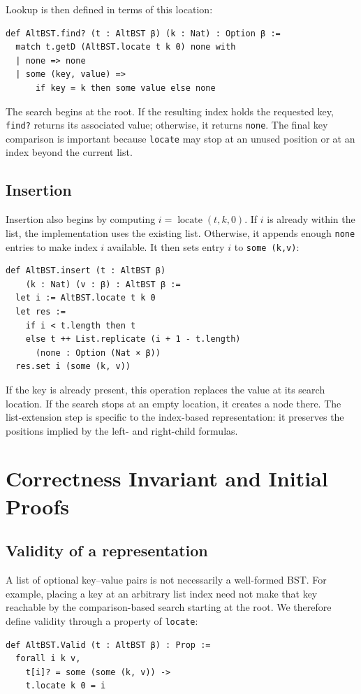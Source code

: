 \documentclass[10pt]{article}
\begin{document}
Lookup is then defined in terms of this location:
\begin{lstlisting}
def AltBST.find? (t : AltBST β) (k : Nat) : Option β :=
  match t.getD (AltBST.locate t k 0) none with
  | none => none
  | some (key, value) =>
      if key = k then some value else none
\end{lstlisting}
The search begins at the root. If the resulting index holds the requested key, \texttt{find?} returns its associated value; otherwise, it returns \texttt{none}. The final key comparison is important because \texttt{locate} may stop at an unused position or at an index beyond the current list.

\subsection{Insertion}

Insertion also begins by computing $i=\operatorname{locate}(t,k,0)$. If $i$ is already within the list, the implementation uses the existing list. Otherwise, it appends enough \texttt{none} entries to make index $i$ available. It then sets entry $i$ to \texttt{some (k,v)}:

\begin{lstlisting}
def AltBST.insert (t : AltBST β)
    (k : Nat) (v : β) : AltBST β :=
  let i := AltBST.locate t k 0
  let res :=
    if i < t.length then t
    else t ++ List.replicate (i + 1 - t.length)
      (none : Option (Nat × β))
  res.set i (some (k, v))
\end{lstlisting}

If the key is already present, this operation replaces the value at its search location. If the search stops at an empty location, it creates a node there. The list-extension step is specific to the index-based representation: it preserves the positions implied by the left- and right-child formulas.

\section{Correctness Invariant and Initial Proofs}

\subsection{Validity of a representation}

A list of optional key--value pairs is not necessarily a well-formed BST. For example, placing a key at an arbitrary list index need not make that key reachable by the comparison-based search starting at the root. We therefore define validity through a property of \texttt{locate}:
\begin{lstlisting}
def AltBST.Valid (t : AltBST β) : Prop :=
  forall i k v,
    t[i]? = some (some (k, v)) ->
    t.locate k 0 = i
\end{lstlisting}
\end{document}
